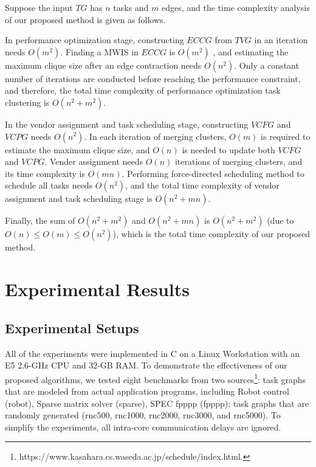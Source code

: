 \documentclass[10pt,journal]{IEEEtran}
\begin{document}
Suppose the input $TG$ has $n$ tasks and $m$ edges, and the time complexity analysis of our proposed method is given as follows.

In performance optimization stage, constructing $ECCG$ from $TVG$ in an iteration needs $O(m^2)$. Finding a MWIS in $ECCG$ is $O(m^2)$ \cite{conference:LC}, and estimating the maximum clique size after an edge contraction needs $O(n^2)$. Only a constant number of iterations are conducted before reaching the performance constraint, and therefore, the total time complexity of performance optimization task clustering is $O(n^2+m^2)$.

In the vendor assignment and task scheduling stage, constructing $VCFG$ and $VCPG$ needs $O(n^2)$. In each iteration of merging clusters, $O(m)$ is required to estimate the maximum clique size, and $O(n)$ is needed to update both $VCFG$ and $VCPG$. Vender assignment needs $O(n)$ iterations of merging clusters, and its time complexity is $O(mn)$. Performing force-directed scheduling method to schedule all tasks needs $O(n^2)$, and the total time complexity of vendor assignment and task scheduling stage is $O(n^2+mn)$.

Finally, the sum of $O(n^2+m^2)$ and $O(n^2+mn)$ is $O(n^2+m^2)$ (due to $O(n)\leq O(m)\leq O(n^2)$), which is the total time complexity of our proposed method.


\section{Experimental Results}

\subsection{Experimental Setups}
All of the experiments were implemented in C on a Linux Workstation with an E5 2.6-GHz CPU and 32-GB RAM. To demonstrate the effectiveness of our proposed algorithms, we tested eight benchmarks from two sources\footnote{https://www.kasahara.cs.waseda.ac.jp/schedule/index.html.}: task graphs that are modeled from actual application programs, including Robot control (robot), Sparse matrix solver (sparse), SPEC fpppp (fpppp); task graphs that are randomly generated (rnc500, rnc1000, rnc2000, rnc3000, and rnc5000). To simplify the experiments, all intra-core communication delays are ignored.
\end{document}
